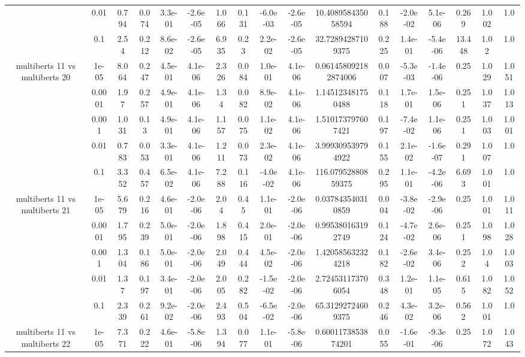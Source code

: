 \begin{tabular}{|c|c|c|c|c|c|c|c|c|c|c|c|c|c|c|c|c|}
 & 0.01 & 0.794 & 0.074 & 3.3e-01 & -2.6e-05 & 1.066 & 0.131 & -6.0e-03 & -2.6e-05 & 10.408958435058594 & 0.188 & -2.0e-02 & 5.1e-06 & 0.269 & 1.002 & 1.0 \\
 & 0.1 & 2.54 & 0.212 & 8.6e-02 & -2.6e-05 & 6.935 & 0.23 & 2.2e-02 & -2.6e-05 & 32.72894287109375 & 0.225 & 1.4e-01 & -5.4e-06 & 13.448 & 1.02 & 1.0 \\
\hline
\multirow{5}{*}{multiberts 11 vs multiberts 20} & 1e-05 & 8.064 & 0.247 & 4.5e-01 & 4.1e-06 & 2.326 & 0.084 & 1.0e-01 & 4.1e-06 & 0.061458092182874006 & 0.007 & -5.3e-03 & -1.4e-06 & 0.25 & 1.029 & 1.051 \\
 & 0.0001 & 1.97 & 0.257 & 4.9e-01 & 4.1e-06 & 1.34 & 0.082 & 8.9e-02 & 4.1e-06 & 1.145123481750488 & 0.118 & 1.7e-01 & 1.5e-06 & 0.251 & 1.037 & 1.013 \\
 & 0.001 & 1.031 & 0.13 & 4.9e-01 & 4.1e-06 & 1.157 & 0.075 & 1.1e-02 & 4.1e-06 & 1.510173797607421 & 0.197 & -7.4e-02 & 1.1e-06 & 0.251 & 1.003 & 1.001 \\
 & 0.01 & 0.783 & 0.053 & 3.3e-01 & 4.1e-06 & 1.211 & 0.073 & 2.3e-02 & 4.1e-06 & 3.999309539794922 & 0.155 & 2.1e-02 & -1.6e-07 & 0.291 & 1.007 & 1.0 \\
 & 0.1 & 3.352 & 0.457 & 6.5e-02 & 4.1e-06 & 7.288 & 0.116 & -4.0e-02 & 4.1e-06 & 116.07952880859375 & 0.295 & 1.1e-01 & -4.2e-06 & 6.693 & 1.001 & 1.0 \\
\hline
\multirow{5}{*}{multiberts 11 vs multiberts 21} & 1e-05 & 5.679 & 0.216 & 4.6e-01 & -2.0e-06 & 2.04 & 0.45 & 1.1e-01 & -2.0e-06 & 0.037843540310859 & 0.004 & -3.8e-02 & -2.9e-06 & 0.25 & 1.001 & 1.011 \\
 & 0.0001 & 1.795 & 0.239 & 5.0e-01 & -2.0e-06 & 1.898 & 0.415 & 2.0e-01 & -2.0e-06 & 0.995380163192749 & 0.124 & -4.7e-02 & 2.6e-06 & 0.251 & 1.098 & 1.028 \\
 & 0.001 & 1.304 & 0.186 & 5.0e-01 & -2.0e-06 & 2.049 & 0.444 & 4.5e-02 & -2.0e-06 & 1.420585632324218 & 0.182 & -2.6e-02 & 3.4e-06 & 0.252 & 1.04 & 1.003 \\
 & 0.01 & 1.37 & 0.197 & 3.4e-01 & -2.0e-06 & 2.005 & 0.282 & -1.5e-02 & -2.0e-06 & 2.724531173706054 & 0.348 & 1.2e-01 & 1.1e-05 & 0.615 & 1.082 & 1.052 \\
 & 0.1 & 2.339 & 0.261 & 9.2e-02 & -2.0e-06 & 2.493 & 0.504 & -6.5e-02 & -2.0e-06 & 65.31292724609375 & 0.246 & 4.3e-02 & 3.2e-06 & 0.562 & 1.001 & 1.0 \\
\hline
\multirow{5}{*}{multiberts 11 vs multiberts 22} & 1e-05 & 7.371 & 0.222 & 4.6e-01 & -5.8e-06 & 1.394 & 0.077 & 1.1e-01 & -5.8e-06 & 0.6001173853874201 & 0.055 & -1.6e-01 & -9.3e-06 & 0.25 & 1.072 & 1.043 \\

\end{tabular}

